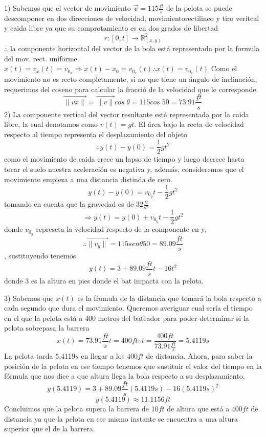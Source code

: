 \documentclass{article}
\begin{document}
    1) Sabemos que el vector de movimiento $\vec{v}=115\frac{ft}{s}$ de la pelota se puede descomponer en dos direcciones de velocidad, movimientorectilineo y tiro veritcal y caida libre ya que su comprotamiento es en dos grados de libertad $$r:\left[0,t\right]\rightarrow \mathbb{R}^2_{(x,y)}$$
    $\therefore$ la componente horizontal del  vector de la bola está representada por la formula del mov. rect. uniforme.$x(t)=v_x(t)=v_{0_x}\Rightarrow x(t)-x_{0}=v_{0_x}(t)\therefore x(t)=v_{0_x}(t)$
    Como el movimiento no es recto completamente, si no que tiene un ángulo de inclinación, requerimos del coseno para calcular la fracció de la velocidad que le corresponde. $$\vec{\|vx\|}=\vec{\|v\|}cos\;\theta = 115cos\;50 = 73.91\frac{ft}{s}$$
    2) La componente vertical del vector resultante está representada por la caida libre, la cual denotamos como $v(t)=gt$.
    El área bajo la recta de velocidad respecto al tiempo representa el desplazamiento del objeto $$\therefore y(t)-y(0)=\frac{1}{2}gt^2$$
    como el movimiento de caida crece un lapso de tiempo y luego decrece hasta tocar el suelo nuestra aceleración es negativa y, además, consideremos que el movimiento empieza a una distancia distinda de cero.$$y(t)-y(0)=v_{0_y}t-\frac{1}{2}gt^2$$ tomando en cuenta que la gravedad es de $32\frac{ft}{s^2}$ $$\Rightarrow y(t)=y(0)+v_{0_y}t-\frac{1}{2}gt^2$$ donde $v_{0_y}$ represeta la velocidad respecto de la componente en y, $$\therefore \vec{\|v_y\|}=115 sen\theta 50=89.09\frac{ft}{s}$$, sustituyendo tenemos$$y(t)=3+89.09\frac{ft}{s}t-16t^2$$ donde 3 es la altura en pies donde el bat impacta con la pelota.
    
    \vspace{5mm} %
    
    3) Sabemos que $x(t)$ es la fŕomula de la distancia que tomará la bola respecto a cada segundo que dura el movimiento. Queremos averiguar cual sería el tiempo en el que la pelota está a 400 metros del bateador para poder determinar si la pelota sobrepasa la barrera
    $$x(t)=73.91\frac{ft}{s}t=400ft\therefore t=\frac{400ft}{73.91\frac{ft}{s}}=5.4119s$$
    La pelota tarda $5.4119s$ en llegar a los $400 ft$ de distancia.
    Ahora, para saber la posición de la pelota en ese tiempo tenemos que sustituir el valor del tiempo en la fórmula que nos dice a que altura llega la bola respecto a su desplazamiento.
    $$y(5.4119)=3+89.09\frac{ft}{s}(5.4119s)-16(5.4119s)^2$$
        $$y(5.4119) \approx 11.1156ft$$
    Concluimos que la pelota supera la barrera de $10ft$ de altura que está a $400 ft$ de distancia ya que la pelota en ese mismo instante se encuentra a una altura superior que el de la barrera.
    
\end{document}
